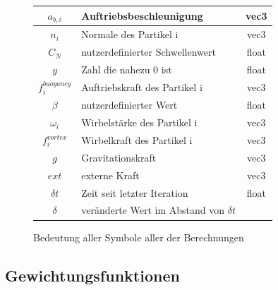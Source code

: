\documentclass[intern,palatino]{cgBA}
\begin{document}
\begin{figure}[H]
\begin{tabular}{ | c | p{8cm} | c |}
			$a_{b,i} $ 	  		&  Auftriebsbeschleunigung							&	vec3	\\ \hline
			$n_i $ 				&  Normale des Partikel i							&	vec3	\\ \hline
			$C_N $ 				&  nutzerdefinierter Schwellenwert					&	float	\\ \hline
			$y $ 				&  Zahl die nahezu 0 ist					 		&	float	\\ \hline
			$f^{buoyancy}_i $ 	&  Auftriebskraft des Partikel i					&	vec3	\\ \hline
			$\beta $ 			&  nutzerdefinierter Wert							&	float	\\ \hline
			$\omega_i $ 		&  Wirbelstärke des Partikel i						&	vec3	\\ \hline
			$f^{vortex}_i $ 	&  Wirbelkraft des Partikel i						&	vec3	\\ \hline
			$g $ 				&  Gravitationskraft								&	vec3	\\ \hline
			$ext $ 				&  externe Kraft									&	vec3	\\ \hline
			$\delta t $ 		&  Zeit seit letzter Iteration 						&	float	\\ \hline
			$\delta $ 			&  veränderte Wert im Abstand von $\delta t$ 		&			\\
			\hline
		\end{tabular}
	\caption{Bedeutung aller Symbole aller der Berechnungen}
	\label{tab:Symbole}
\end{figure}


\subsection{Gewichtungsfunktionen}\label{kernel}
\end{document}
